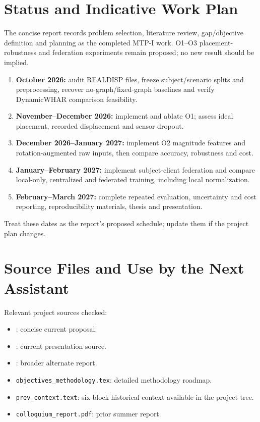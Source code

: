 \documentclass[10pt,a4paper]{article}
\begin{document}
\section{Status and Indicative Work Plan}
The concise report records problem selection, literature review, gap/objective definition and planning as the completed MTP-I work. O1--O3 placement-robustness and federation experiments remain proposed; no new result should be implied.
\begin{enumerate}
\item \textbf{October 2026:} audit REALDISP files, freeze subject/scenario splits and preprocessing, recover no-graph/fixed-graph baselines and verify DynamicWHAR comparison feasibility.
\item \textbf{November--December 2026:} implement and ablate O1; assess ideal placement, recorded displacement and sensor dropout.
\item \textbf{December 2026--January 2027:} implement O2 magnitude features and rotation-augmented raw inputs, then compare accuracy, robustness and cost.
\item \textbf{January--February 2027:} implement subject-client federation and compare local-only, centralized and federated training, including local normalization.
\item \textbf{February--March 2027:} complete repeated evaluation, uncertainty and cost reporting, reproducibility materials, thesis and presentation.
\end{enumerate}
Treat these dates as the report's proposed schedule; update them if the project plan changes.

\section{Source Files and Use by the Next Assistant}
Relevant project sources checked:
\begin{itemize}
\item {}: concise current proposal.
\item {}: current presentation source.
\item {}: broader alternate report.
\item \texttt{objectives\_methodology.tex}: detailed methodology roadmap.
\item \texttt{prev\_context.text}: six-block historical context available in the project tree.
\item \texttt{colloquium\_report.pdf}: prior summer report.
\end{itemize}
\end{document}
